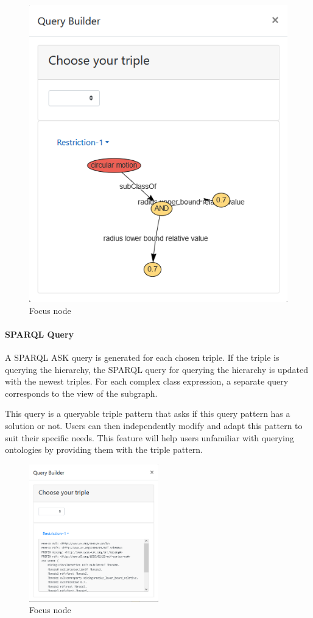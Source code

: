 \begin{figure}[H]
    \includegraphics[scale=0.4]{Graphics/OwlVisualizer/queryBuilder4.png}
    \centering
    \caption{Focus node}
\end{figure}

\paragraph{SPARQL Query}
A SPARQL ASK query is generated for each chosen triple. If the triple is querying the hierarchy, the SPARQL query for querying the hierarchy is updated with the newest triples.
For each complex class expression, a separate query corresponds to the view of the subgraph.

This query is a queryable triple pattern that asks if this query pattern has a solution or not. 
Users can then independently modify and adapt this pattern to suit their specific needs. 
This feature will help users unfamiliar with querying ontologies by providing them with the triple pattern.
\begin{figure}[H]
    \includegraphics[width=0.5\textwidth]{Graphics/OwlVisualizer/queryBuilder5.png}
    \centering
    \caption{Focus node}
\end{figure}


